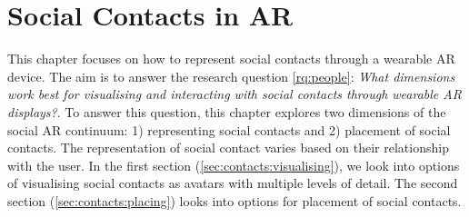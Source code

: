 \chapter{Social Contacts in AR}
\label{ch:contacts} 

This chapter focuses on how to represent social contacts through a wearable AR device. The aim is to answer the research question \ref{rq:people}: \textit{What dimensions work best for visualising and interacting with social contacts through wearable AR displays?}. To answer this question, this chapter explores two dimensions of the social AR continuum: 1) representing social contacts and 2) placement of social contacts. The representation of social contact varies based on their relationship with the user. 
In the first section (\ref{sec:contacts:visualising}), we look into options of visualising social contacts as avatars with multiple levels of detail. The second section (\ref{sec:contacts:placing}) looks into options for placement of social contacts. 





